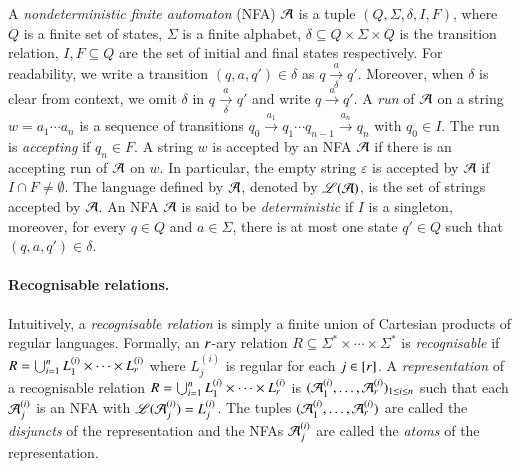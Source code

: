 A \emph{nondeterministic finite automaton} (NFA) $\mathcal{A}$ is a tuple $(Q, \Sigma, \delta, I, F)$, where $Q$ is a finite set of states, $\Sigma$ is a finite alphabet, $\delta \subseteq Q \times \Sigma \times Q$ is the transition relation, $I,F \subseteq Q$ are the set of initial and final states respectively. For readability, we write a transition $(q, a, q') \in \delta$ as $q \xrightarrow[\delta]{a} q'$. Moreover, when $\delta$ is clear from context, we omit $\delta$ in $q \xrightarrow[\delta]{a} q'$ and write $q \xrightarrow{a} q'$.
%
A \emph{run} of $\mathcal{A}$ on a string $w = a_1 \cdots a_n$ is a sequence of transitions $q_0 \xrightarrow{a_1} q_1 \cdots q_{n-1} \xrightarrow{a_n} q_n$ with $q_0 \in I$. The run is \emph{accepting} if $q_n \in F$.
A string $w$ is accepted by an NFA $\mathcal{A}$ if there is an accepting run of $\mathcal{A}$ on $w$. In particular, the empty string $\varepsilon$ is accepted by $\mathcal{A}$ if $I \cap F \neq \emptyset$. The language defined by $\mathcal{A}$, denoted by $\mathscr{L}(\mathcal{A})$, is the set of strings accepted by $\mathcal{A}$. An NFA $\mathcal{A}$ is said to be \emph{deterministic} if $I$ is a singleton, moreover, for every $q \in Q$ and $a \in \Sigma$, there is at most one state $q' \in Q$ such that $(q, a, q') \in \delta$.

\paragraph*{Recognisable relations.} Intuitively, a \emph{recognisable relation} is simply a finite union of Cartesian products of regular languages. Formally, an $r$-ary relation $R\subseteq \Sigma^*\times \cdots\times \Sigma^*$ is \emph{recognisable} if $R=\bigcup_{i=1}^n L^{(i)}_1\times \cdots\times L^{(i)}_r$ where $L^{(i)}_j$ is regular for each $j\in [r]$. A \emph{representation} of a recognisable relation $R=\bigcup_{i=1}^n L^{(i)}_1\times \cdots\times L^{(i)}_r$ is $(\mathcal{A}^{(i)}_1, \ldots, \mathcal{A}^{(i)}_r)_{1 \le i \le n}$ such that each $\mathcal{A}^{(i)}_j$ is an NFA with $\mathscr{L}(\mathcal{A}^{(i)}_j)=L^{(i)}_j$. The tuples $(\mathcal{A}^{(i)}_1, \ldots, \mathcal{A}^{(i)}_r)$ are called the \emph{disjuncts} of the representation and the NFAs $\mathcal{A}^{(i)}_j$ are called the \emph{atoms} of the representation.




 

